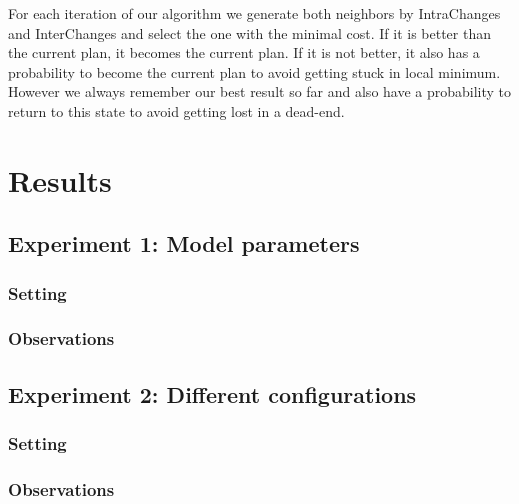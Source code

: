 \documentclass[11pt]{article}
\begin{document}
For each iteration of our algorithm we generate both neighbors by IntraChanges and InterChanges and select the one with the minimal cost. If it is better than the current plan, it becomes the current plan. If it is not better, it also has a probability to become the current plan to avoid getting stuck in local minimum. However we always remember our best result so far and also have a probability to return to this state to avoid getting lost in a dead-end.


\section{Results}

\subsection{Experiment 1: Model parameters}

\subsubsection{Setting}

\subsubsection{Observations}

\subsection{Experiment 2: Different configurations}

\subsubsection{Setting}

\subsubsection{Observations}
\end{document}
